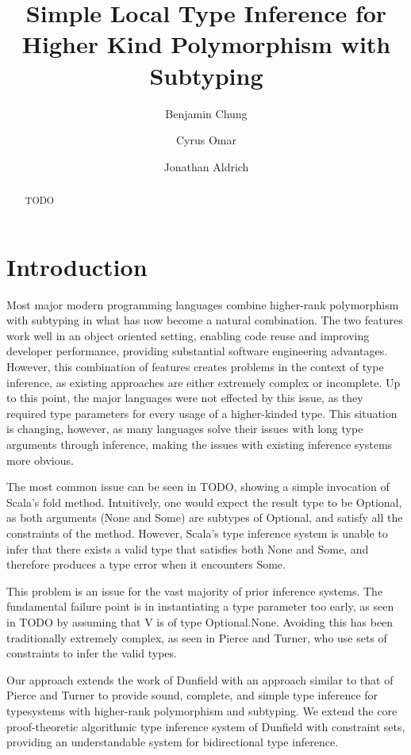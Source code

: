 \documentclass{llncs}
\title{Simple Local Type Inference for Higher Kind Polymorphism with Subtyping}
\author{Benjamin Chung\and Cyrus Omar \and Jonathan Aldrich}
\institute{\email{\{bwchung,comar,aldrich\}@cs.cmu.edu}\\Carnegie Mellon University}
\begin{document}
\maketitle
\begin{abstract}
TODO
\end{abstract}
\section{Introduction}
Most major modern programming languages combine higher-rank polymorphism with subtyping in what has now become a natural combination. The two features work well in an object oriented setting, enabling code reuse and improving developer performance, providing substantial software engineering advantages. However, this combination of features creates problems in the context of type inference, as existing approaches are either extremely complex or incomplete. Up to this point, the major languages were not effected by this issue, as they required type parameters for every usage of a higher-kinded type. This situation is changing, however, as many languages solve their issues with long type arguments through inference, making the issues with existing inference systems more obvious.

The most common issue can be seen in TODO, showing a simple invocation of Scala's fold method. Intuitively, one would expect the result type to be Optional, as both arguments (None and Some) are subtypes of Optional, and satisfy all the constraints of the method. However, Scala's type inference system is unable to infer that there exists a valid type that satisfies both None and Some, and therefore produces a type error when it encounters Some.

This problem is an issue for the vast majority of prior inference systems. The fundamental failure point is in instantiating a type parameter too early, as seen in TODO by assuming that V is of type Optional.None. Avoiding this has been traditionally extremely complex, as seen in Pierce and Turner, who use sets of constraints to infer the valid types.

Our approach extends the work of Dunfield with an approach similar to that of Pierce and Turner to provide sound, complete, and simple type inference for typesystems with higher-rank polymorphism and subtyping. We extend the core proof-theoretic algorithmic type inference system of Dunfield with constraint sets, providing an understandable system for bidirectional type inference.
\end{document}
